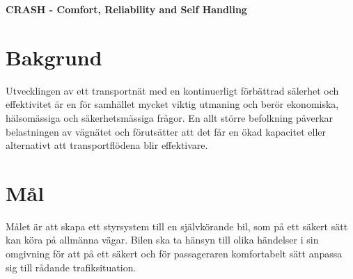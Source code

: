 \documentclass[10pt]{article}
\date{}
\begin{document}

\begin{center}
{\Large
\textbf{CRASH - Comfort, Reliability and Self Handling}
}
\end{center}


\tableofcontents
\newpage

\section{Bakgrund}
\sloppy
\noindent Utvecklingen av ett transportnät med en kontinuerligt förbättrad sälerhet och effektivitet är en för samhället mycket viktig utmaning och berör ekonomiska, hälsomässiga och säkerhetsmässiga frågor. En allt större befolkning påverkar belastningen av vägnätet och förutsätter att det får en ökad kapacitet eller alternativt att transportflödena blir effektivare.

\section{Mål}
\sloppy
\noindent Målet är att skapa ett styrsystem till en självkörande bil, som på ett säkert sätt kan köra på allmänna vägar. Bilen ska ta hänsyn till olika händelser i sin omgivning för att på ett säkert och för passageraren komfortabelt sätt anpassa sig till rådande trafiksituation. 

\end{document}
